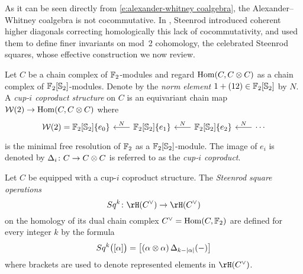 As it can be seen directly from \eqref{e:alexander-whitney coalgebra}, the Alexander--Whitney coalgebra is not cocommutative.
In \cite{steenrod1947products}, Steenrod introduced coherent higher diagonals correcting homologically this lack of cocommutativity, and used them to define finer invariants on mod~2 cohomology, the celebrated Steenrod squares, whose effective construction we now review.

Let $C$ be a chain complex of ${\mathbb{F}_2}$-modules and regard $\mathrm{Hom}(C, C \otimes C)$ as a chain complex of ${\mathbb{F}_2}[\mathbb{S}_2]$-modules.
Denote by the \textit{norm element} $1 + (12) \in {\mathbb{F}_2}[\mathbb{S}_2]$ by $N$.
A \textit{cup-$i$ coproduct structure} on $C$ is an equivariant chain map
$\mathcal{W}(2) \to \mathrm{Hom}(C, C \otimes C)$ where
\begin{equation} \label{e:minimal resolution r=2}
\begin{tikzcd} [column sep = .7cm]
\mathcal W(2) = \Ftwo[\Sym_2]\{e_0\} & \arrow[l, "N"'] \Ftwo[\Sym_2]\{e_1\} & \arrow[l, "N"'] \Ftwo[\Sym_2]\{e_2\} & \arrow[l, "N"'] \cdots
\end{tikzcd}
\end{equation}
is the minimal free resolution of ${\mathbb{F}_2}$ as a ${\mathbb{F}_2}[\mathbb{S}_2]$-module.
The image of $e_i$ is denoted by $\operatorname{\Delta}_i \colon C \to C \otimes C$ is referred to as the \textit{cup-$i$ coproduct}.

Let $C$ be equipped with a cup-$i$ coproduct structure.
The \textit{Steenrod square operations}
\[
Sq^k \colon \rH(C^\vee) \to \rH(C^\vee)
\]
on the homology of its dual chain complex $C^\vee = \mathrm{Hom}(C, {\mathbb{F}_2})$ are defined for every integer $k$ by the formula
\begin{equation} \label{e:steenrod squares}
Sq^k \big( [\alpha] \big) = \big[ (\alpha \otimes \alpha) \operatorname{\Delta}_{k - \lvert\alpha\rvert}(-) \big]
\end{equation}
where brackets are used to denote represented elements in $\rH(C^\vee)$.


